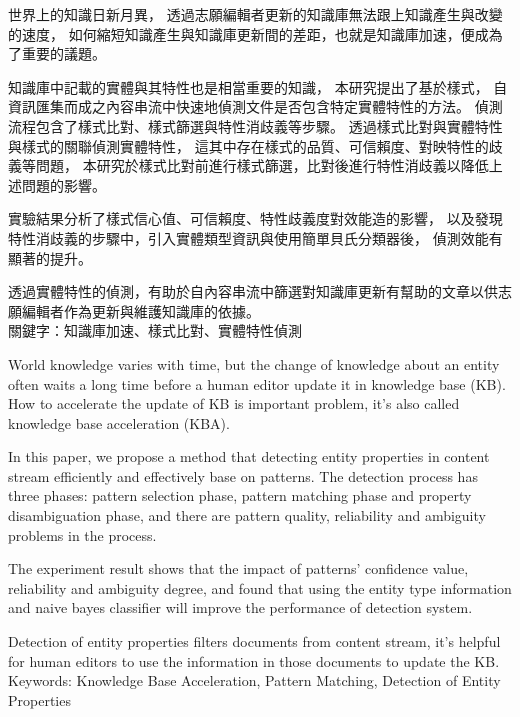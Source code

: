 \begin{abstractzh}

世界上的知識日新月異，
透過志願編輯者更新的知識庫無法跟上知識產生與改變的速度，
如何縮短知識產生與知識庫更新間的差距，也就是知識庫加速，便成為了重要的議題。

知識庫中記載的實體與其特性也是相當重要的知識，
本研究提出了基於樣式，
自資訊匯集而成之內容串流中快速地偵測文件是否包含特定實體特性的方法。
偵測流程包含了樣式比對、樣式篩選與特性消歧義等步驟。
透過樣式比對與實體特性與樣式的關聯偵測實體特性，
這其中存在樣式的品質、可信賴度、對映特性的歧義等問題，
本研究於樣式比對前進行樣式篩選，比對後進行特性消歧義以降低上述問題的影響。

實驗結果分析了樣式信心值、可信賴度、特性歧義度對效能造的影響，
以及發現特性消歧義的步驟中，引入實體類型資訊與使用簡單貝氏分類器後，
偵測效能有顯著的提升。

透過實體特性的偵測，有助於自內容串流中篩選對知識庫更新有幫助的文章以供志願編輯者作為更新與維護知識庫的依據。\\

\noindent
關鍵字：知識庫加速、樣式比對、實體特性偵測

\end{abstractzh}

\begin{abstracten}

World knowledge varies with time, 
but the change of knowledge about an entity often waits 
a long time before a human editor update it in knowledge base (KB).
How to accelerate the update of KB is important problem, 
it's also called knowledge base acceleration (KBA).

In this paper, we propose a method that detecting entity properties 
in content stream efficiently and effectively base on patterns. 
The detection process has three phases: 
pattern selection phase, pattern matching phase and 
property disambiguation phase, 
and there are pattern quality, 
reliability and ambiguity problems in the process. 

The experiment result shows that the impact of patterns' confidence value, reliability
and ambiguity degree, 
and found that using the entity type information and naive bayes classifier will improve the performance of detection system.

Detection of entity properties filters documents from content stream,
it's helpful for human editors to use the information in those documents to update the KB.\\

\noindent
Keywords: Knowledge Base Acceleration, Pattern Matching, Detection of Entity Properties
\end{abstracten}

